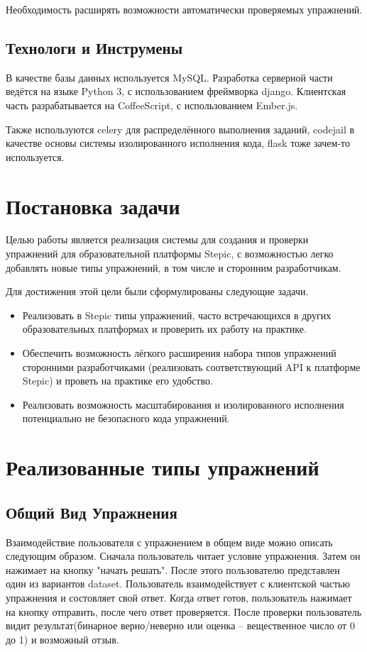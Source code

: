 \documentclass{matmex-diploma-custom}
\begin{document}
Необходимость расширять возможности автоматически проверяемых упражнений.

\subsection*{Технологи и Инструмены}
В качестве базы данных используется MySQL. Разработка серверной части
ведётся на языке Python 3, с использованием фреймворка
django. Клиентская часть разрабатывается на CoffeeScript, с
использованием Ember.js.

Также используются celery для распределённого выполнения заданий,
codejail в качестве основы системы изолированного исполнения кода,
flask тоже зачем-то используется.

\section{Постановка задачи}
Целью работы является реализация системы для создания и проверки
упражнений для образовательной платформы Stepic, с возможностью легко
добавлять новые типы упражнений, в том числе и сторонним
разработчикам.

Для достижения этой цели были сформулированы следующие задачи.

\begin{itemize}
        \item Реализовать в Stepic типы упражнений, часто встречающихся в других
        образовательных платформах и проверить их работу на практике.

        \item Обеспечить возможность лёгкого расширения набора типов упражнений
        сторонними разработчиками (реализовать соответствующий API к платформе
        Stepic) и проветь на практике его удобство.

        \item Реализовать возможность масштабирования и изолированного исполнения
        потенциально не безопасного кода упражнений.
\end{itemize}

\section{Реализованные типы упражнений}

\subsection*{Общий Вид Упражнения}
Взаимодействие пользователя с упражнением в общем виде можно
описать следующим образом.  Сначала пользователь читает условие
упражнения. Затем он нажимает на кнопку "начать решать". После
этого пользователю представлен один из вариантов
dataset. Пользователь взаимодействует с клиентской частью
упражнения и состовляет свой ответ. Когда ответ готов, пользователь
нажимает на кнопку отправить, после чего ответ проверяется. После
проверки пользователь видит результат(бинарное верно/неверно или
оценка -- вещественное число от 0 до 1) и возможный отзыв.
\end{document}
